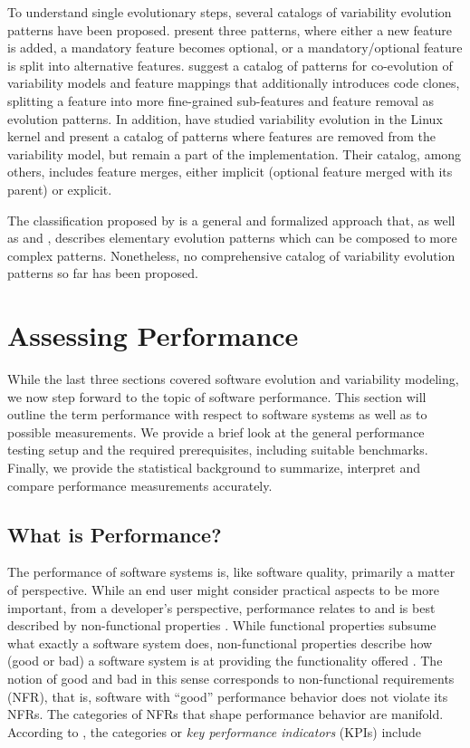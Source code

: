 To understand single evolutionary steps, several catalogs of variability
evolution patterns have been proposed. \cite{peng_analyzing_2011} present three patterns,
where either a new feature is added, a mandatory feature becomes optional, or a
mandatory/optional feature is split into alternative features. \cite{seidl_co-evolution_2012} suggest a catalog of
patterns for co-evolution of variability models and feature mappings that additionally introduces code clones, splitting a feature
into more fine-grained sub-features and feature removal as evolution patterns.
In addition, \cite{passos_towards_2012} have studied variability evolution in
the Linux kernel and present a catalog of patterns where features are removed from the
variability model, but remain a part of the implementation. Their
catalog, among others, includes feature merges, either implicit (optional feature merged
with its parent) or explicit.

The classification proposed by \cite{peng_analyzing_2011} is a general and formalized approach
that, as well as \cite{seidl_co-evolution_2012} and \cite{passos_towards_2012}, describes
elementary evolution patterns which can be composed to more complex patterns. Nonetheless, no
comprehensive catalog of variability evolution patterns so far has been
proposed.

\section{Assessing Performance} \label{sec:assessing_performance}
While the last three sections covered software evolution and variability
modeling, we now step forward to the topic of software performance. This
section will outline the term performance with respect to software systems as
well as to possible measurements. We provide a brief look at the general performance
testing setup and the required prerequisites, including suitable benchmarks.
Finally, we provide the statistical background to summarize, interpret and
compare performance measurements accurately.

\subsection{What is Performance?}
The performance of software systems is, like software quality, primarily a
matter of perspective. While an end user might consider practical aspects to be
more important, from a developer’s perspective, performance relates to and is
best described by non-functional properties
\citep{liggesmeyer_software-qualitat:_2009,molyneaux_art_2014}.
While functional properties subsume what exactly a software system does, non-functional
properties describe how (good or bad) a software system is at providing the
functionality offered \citep{liggesmeyer_software-qualitat:_2009}. The notion
of good and bad in this sense corresponds to non-functional requirements (NFR),
that is, software with ``good'' performance behavior does not violate its NFRs.
The categories of NFRs that shape performance behavior are manifold. According to \cite{molyneaux_art_2014}, the categories or
\emph{key performance indicators} (KPIs) include 

